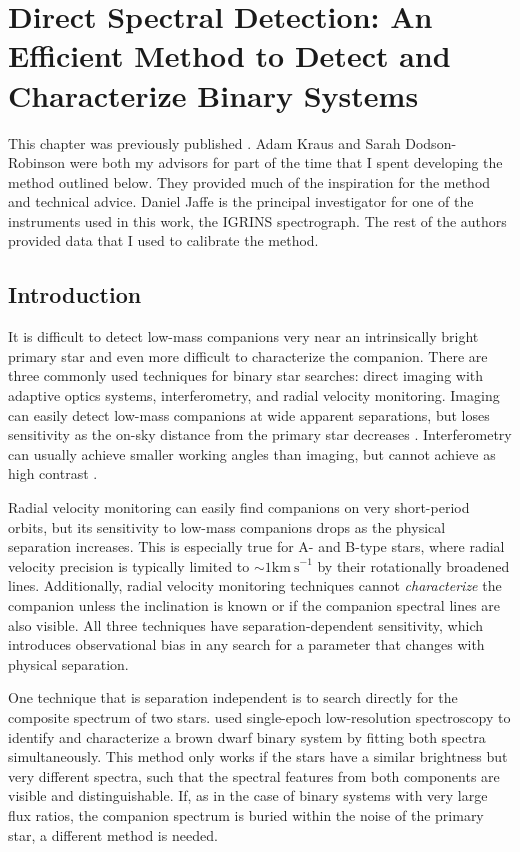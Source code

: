 \chapter{Direct Spectral Detection: An Efficient Method to Detect and Characterize Binary Systems}
\label{chap:dsd}
This chapter was previously published \citep{Gullikson2016}. Adam Kraus and Sarah Dodson-Robinson were both my advisors for part of the time that I spent developing the method outlined below. They provided much of the inspiration for the method and technical advice. Daniel Jaffe is the principal investigator for one of the instruments used in this work, the IGRINS spectrograph. The rest of the authors provided data that I used to calibrate the method.

\section{Introduction}
\label{paper5_sec:intro}


It is difficult to detect low-mass companions very near an intrinsically bright primary star and even more difficult to characterize the companion. There are three commonly used techniques for binary star searches: direct imaging with adaptive optics systems,  interferometry, and radial velocity monitoring. Imaging can easily detect low-mass companions at wide apparent separations, but loses sensitivity as the on-sky distance from the primary star decreases \citep[see][for typical sensitivity curves]{DeRosa2014}. Interferometry can usually achieve smaller working angles than imaging, but cannot achieve as high contrast \citep[see e.g.][]{Aldoretta2015}.

 Radial velocity monitoring can easily find companions on very short-period orbits, but its sensitivity to low-mass companions drops as the physical separation increases. This is especially true for A- and B-type stars, where radial velocity precision is typically limited to $\sim 1 \mathrm{km\ s}^{-1}$ by their rotationally broadened lines. Additionally, radial velocity monitoring techniques cannot \emph{characterize} the companion unless the inclination is known or if the companion spectral lines are also visible. All three techniques have separation-dependent sensitivity, which introduces observational bias in any search for a parameter that changes with physical separation.
 
 One technique that is separation independent is to search directly for the composite spectrum of two stars. \citet{Burgasser2007} used single-epoch low-resolution spectroscopy to identify and characterize a brown dwarf binary system by fitting both spectra simultaneously. This method only works if the stars have a similar brightness but very different spectra, such that the spectral features from both components are visible and distinguishable. If, as in the case of binary systems with very large flux ratios, the companion spectrum is buried within the noise of the primary star, a different method is needed.
 
